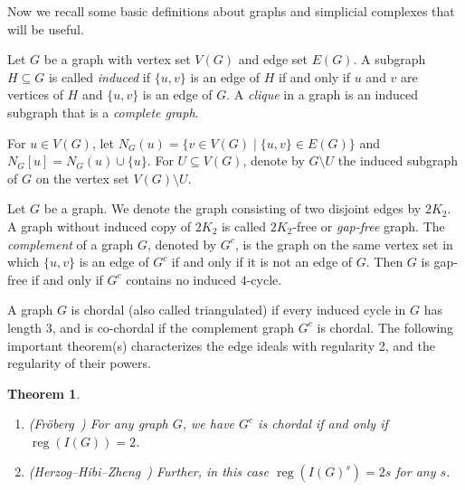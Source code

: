 \documentclass[10pt]{article}
\newtheorem{theorem}{Theorem}[section]
\theoremstyle{definition}
\numberwithin{equation}{section}
\newcommand \reg{\operatorname{reg}}
\begin{document}
Now we recall some basic definitions about graphs and simplicial complexes that will be useful.

Let $G$ be a graph with vertex set $V(G)$
and edge set $E(G)$.  
A subgraph $H \subseteq G$  is called \textit{induced} if $\{u,v\}$ is an edge of $H$ if and only if $u$ and $v$ are vertices of $H$ and $\{u,v\}$ is an edge of $G$. 
A \textit{clique} in a graph is an induced subgraph that is a  \emph{complete graph}.

For $u\in V(G)$, let $N_G(u) = \{v \in V (G)\mid \{u, v\} \in E(G)\}$ and $N_G[u]=N_G(u)\cup \{u\}$.
For $U \subseteq V(G)$, denote by $G \setminus U$
the induced subgraph of $G$ on the vertex set $V(G) \setminus U$.

Let $G$ be a graph. We denote the graph consisting of two disjoint edges
 by $2K_2$.
A graph without induced copy of $2K_2$ is called $2K_2$-free or \textit{gap-free} graph. The \textit{complement} of a graph $G$, denoted by $G^c$, is the graph on the same
vertex set in which $\{u,v\}$ is an edge of $G^c$ if and only if it is not an edge of $G$.
Then  $G$ is gap-free if and only if $G^c$ contains no induced $4$-cycle.

A graph $G$ is chordal (also called triangulated) if every induced
cycle in $G$ has length $3$, and is co-chordal if the complement graph $G^c$ is chordal.
 The following important theorem(s) characterizes the edge ideals with regularity 2, and the regularity of their powers.

 

\begin{theorem}
\begin{enumerate}
\item \textup{(}Fr\"oberg~\cite[Thm.1]{froberg}\textup{)} For any graph $G$, we have $G^c$ is chordal if and only if $\reg(I(G))=2$. 

\item \textup{(}Herzog--Hibi--Zheng~\cite[Thm.1.2]{HHZ}\textup{)} Further, in this case $\reg(I(G)^s)=2s$ for any $s$.
\end{enumerate}
\label{thm:chordal}
\end{theorem}
\end{document}
